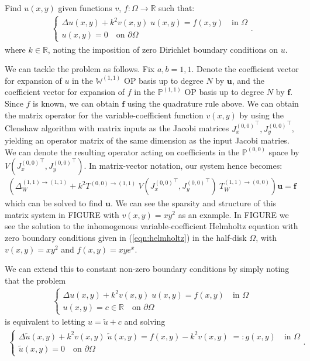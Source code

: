 \documentclass[11pt, oneside]{article}   	%
\newcommand{\R}{\mathbb{R}}
\newcommand{\bigPii}{{\mathbb{P}^{(1,1)}}}
\newcommand{\bigPoo}{{\mathbb{P}^{(0,0)}}}
\newcommand{\laplacewii}{\Delta_W^{(1,1)\to(1,1)}}
\newcommand{\bigWii}{{\mathbb{W}^{(1,1)}}}
\begin{document}
Find \(u(x,y)\) given functions $v$, $f : \Omega \to \R$ such that:
\begin{align}
	\begin{cases}
    		\Delta u(x,y) + k^2 v(x,y) \; u(x,y) = f(x,y) \quad \text{in } \Omega \\
		u(x,y) = 0 \quad \text{on } \partial \Omega
	\end{cases}.
	\label{eqn:helmholtz}
\end{align}
where $k \in \R$, noting the imposition of zero Dirichlet boundary conditions on $u$.

We can tackle the problem as follows. Fix \(a, b = 1,1\). Denote the coefficient vector for expansion of $u$ in the $\bigWii$ OP basis up to degree $N$ by $\mathbf{u}$, and the coefficient vector for expansion of $f$ in the $\bigPii$ OP basis up to degree $N$ by $\mathbf{f}$. Since $f$ is known, we can obtain $\mathbf{f}$ using the quadrature rule above. We can obtain the matrix operator for the variable-coefficient function $v(x,y)$ by using the Clenshaw algorithm with matrix inputs as the Jacobi matrices ${J_x^{(0,0)}}^\top, {J_y^{(0,0)}}^\top$, yielding an operator matrix of the same dimension as the input Jacobi matries. We can denote the resulting operator acting on coefficients in the $\bigPoo$ space by $V({J_x^{(0,0)}}^\top, {J_y^{(0,0)}}^\top)$. In matrix-vector notation, our system hence becomes:
\begin{align}
    (\laplacewii + k^2 T^{(0,0)\to(1,1)} \: V({J_x^{(0,0)}}^\top, {J_y^{(0,0)}}^\top) \: T_W^{(1,1)\to(0,0)}) \mathbf{u} = \mathbf{f}
\end{align}
which can be solved to find $\mathbf{u}$. We can see the sparsity and structure of this matrix system in FIGURE with $v(x,y) = xy^2$ as an example. In FIGURE we see the solution to the inhomogenous variable-coefficient Helmholtz equation with zero boundary conditions given in (\ref{eqn:helmholtz}) in the half-disk $\Omega$, with  $v(x,y) = xy^2$ and $f(x,y) = xy e^x$.

We can extend this to constant non-zero boundary conditions by simply noting that the problem 
\begin{align}
	\begin{cases}
    		\Delta u(x,y) + k^2 v(x,y) \; u(x,y) = f(x,y) \quad \text{in } \Omega \\
		u(x,y) = c \in \R \quad \text{on } \partial \Omega
	\end{cases}
\end{align}
is equivalent to letting $u = \tilde{u} + c$ and solving
\begin{align}
	\begin{cases}
    		\Delta \tilde{u}(x,y) + k^2 v(x,y) \; \tilde{u}(x,y) = f(x,y) - k^2 v(x,y) \; =: g(x,y)  \quad \text{in } \Omega \\
		\tilde{u}(x,y) = 0 \quad \text{on } \partial \Omega
	\end{cases}.
\end{align}
\end{document}
